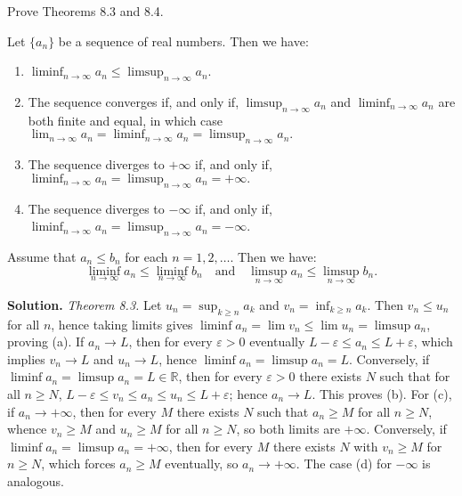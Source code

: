 \begin{problembox}
Prove Theorems 8.3 and 8.4.

\begin{theorem}[Theorem 8.3]
Let \(\{a_n\}\) be a sequence of real numbers. Then we have:
\begin{enumerate}[label=\alph*)]
\item \(\liminf_{n \to \infty} a_n \leq \limsup_{n \to \infty} a_n.\)
\item The sequence converges if, and only if, \(\limsup_{n \to \infty} a_n\) and \(\liminf_{n \to \infty} a_n\) are both finite and equal, in which case \(\lim_{n \to \infty} a_n = \liminf_{n \to \infty} a_n = \limsup_{n \to \infty} a_n.\)
\item The sequence diverges to \(+\infty\) if, and only if, \(\liminf_{n \to \infty} a_n = \limsup_{n \to \infty} a_n = +\infty.\)
\item The sequence diverges to \(-\infty\) if, and only if, \(\liminf_{n \to \infty} a_n = \limsup_{n \to \infty} a_n = -\infty\).
\end{enumerate}
\end{theorem}

\begin{theorem}[Theorem 8.4]
Assume that \(a_n \leq b_n\) for each \(n = 1, 2, \ldots\). Then we have:
\[
\liminf_{n \to \infty} a_n \leq \liminf_{n \to \infty} b_n \quad \text{and} \quad \limsup_{n \to \infty} a_n \leq \limsup_{n \to \infty} b_n.
\]
\end{theorem}

\end{problembox}

\noindent\textbf{Solution.}
\emph{Theorem 8.3.} Let \(u_n=\sup_{k\ge n} a_k\) and \(v_n=\inf_{k\ge n} a_k\). Then \(v_n\le u_n\) for all \(n\), hence taking limits gives \(\liminf a_n=\lim v_n\le \lim u_n=\limsup a_n\), proving (a). If \(a_n\to L\), then for every \(\varepsilon>0\) eventually \(L-\varepsilon\le a_n\le L+\varepsilon\), which implies \(v_n\to L\) and \(u_n\to L\), hence \(\liminf a_n=\limsup a_n=L\). Conversely, if \(\liminf a_n=\limsup a_n=L\in\mathbb{R}\), then for every \(\varepsilon>0\) there exists \(N\) such that for all \(n\ge N\), \(L-\varepsilon\le v_n\le a_n\le u_n\le L+\varepsilon\); hence \(a_n\to L\). This proves (b). For (c), if \(a_n\to +\infty\), then for every \(M\) there exists \(N\) such that \(a_n\ge M\) for all \(n\ge N\), whence \(v_n\ge M\) and \(u_n\ge M\) for all \(n\ge N\), so both limits are \(+\infty\). Conversely, if \(\liminf a_n=\limsup a_n=+\infty\), then for every \(M\) there exists \(N\) with \(v_n\ge M\) for \(n\ge N\), which forces \(a_n\ge M\) eventually, so \(a_n\to +\infty\). The case (d) for \(-\infty\) is analogous.

